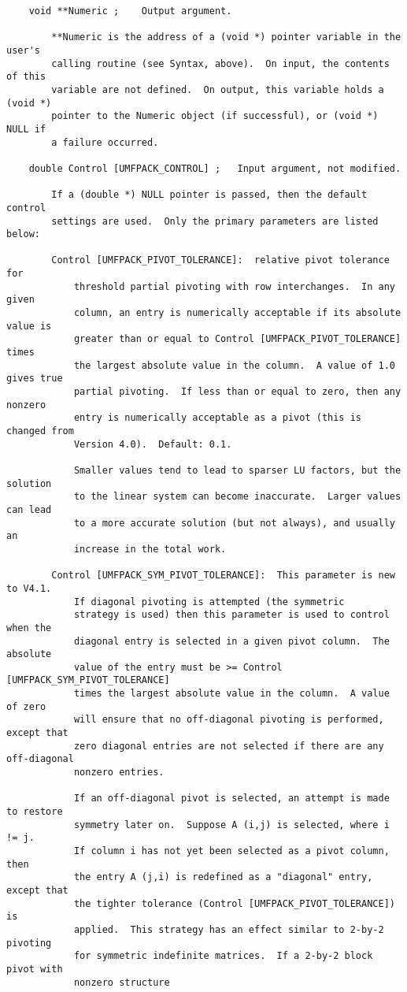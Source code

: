 \documentclass[11pt]{article}
\begin{document}
{\begin{verbatim}
    void **Numeric ;    Output argument.

        **Numeric is the address of a (void *) pointer variable in the user's
        calling routine (see Syntax, above).  On input, the contents of this
        variable are not defined.  On output, this variable holds a (void *)
        pointer to the Numeric object (if successful), or (void *) NULL if
        a failure occurred.

    double Control [UMFPACK_CONTROL] ;   Input argument, not modified.

        If a (double *) NULL pointer is passed, then the default control
        settings are used.  Only the primary parameters are listed below:

        Control [UMFPACK_PIVOT_TOLERANCE]:  relative pivot tolerance for
            threshold partial pivoting with row interchanges.  In any given
            column, an entry is numerically acceptable if its absolute value is
            greater than or equal to Control [UMFPACK_PIVOT_TOLERANCE] times
            the largest absolute value in the column.  A value of 1.0 gives true
            partial pivoting.  If less than or equal to zero, then any nonzero
            entry is numerically acceptable as a pivot (this is changed from
            Version 4.0).  Default: 0.1.

            Smaller values tend to lead to sparser LU factors, but the solution
            to the linear system can become inaccurate.  Larger values can lead
            to a more accurate solution (but not always), and usually an
            increase in the total work.

        Control [UMFPACK_SYM_PIVOT_TOLERANCE]:  This parameter is new to V4.1.
            If diagonal pivoting is attempted (the symmetric
            strategy is used) then this parameter is used to control when the
            diagonal entry is selected in a given pivot column.  The absolute
            value of the entry must be >= Control [UMFPACK_SYM_PIVOT_TOLERANCE]
            times the largest absolute value in the column.  A value of zero
            will ensure that no off-diagonal pivoting is performed, except that
            zero diagonal entries are not selected if there are any off-diagonal
            nonzero entries.

            If an off-diagonal pivot is selected, an attempt is made to restore
            symmetry later on.  Suppose A (i,j) is selected, where i != j.
            If column i has not yet been selected as a pivot column, then
            the entry A (j,i) is redefined as a "diagonal" entry, except that
            the tighter tolerance (Control [UMFPACK_PIVOT_TOLERANCE]) is
            applied.  This strategy has an effect similar to 2-by-2 pivoting
            for symmetric indefinite matrices.  If a 2-by-2 block pivot with
            nonzero structure


\end{verbatim}}
\end{document}
